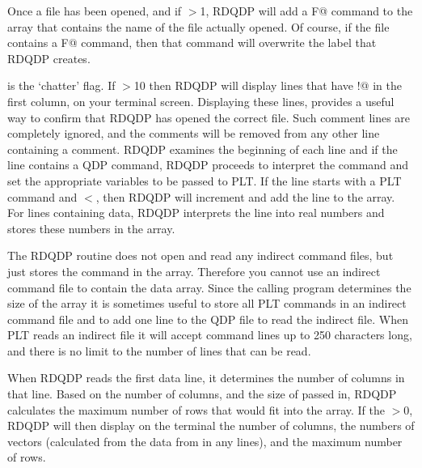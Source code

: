 Once a file has been opened, and if \verb@MXCMD@$>$1, RDQDP
will add a \verb@LAbel F@ command to the \verb@CMD@ array that contains
the name of the file actually opened.
Of course, if the file contains a \verb@LAbel F@ command, then that
command will overwrite the label that RDQDP creates.

\verb@ICHAT@ is the `chatter' flag.
If \verb@ICHAT@$>$10 then RDQDP will display lines that have
\verb@!@ in the first column, on your terminal screen.
Displaying these lines, provides a useful way to confirm that
RDQDP has opened the correct file.
Such comment lines are completely ignored,
and the comments will be removed from any other line containing a comment.
RDQDP examines the beginning of each line and if the
line contains a QDP command, RDQDP proceeds to interpret
the command and set the appropriate variables to be passed to PLT.
If the line starts with a PLT command and \verb@NCMD@$<$\verb@MXCMD@,
then RDQDP will increment \verb@NCMD@ and add the line to the
\verb@CMD@ array.
For lines containing data, RDQDP interprets the line into
real numbers and stores these numbers in the \verb@Y@ array.

The RDQDP routine does not open and read any indirect command files,
but just stores the command in the \verb@CMD@ array.
Therefore you cannot use an indirect command file to contain
the data array.
Since the calling program determines the size of the \verb@CMD@ array
it is sometimes useful to store all PLT commands in an indirect command
file and to add one line to the QDP file to read the indirect file.
When PLT reads an indirect file it will accept command lines
up to 250 characters long, and there is no limit to the number of
lines that can be read.

When RDQDP reads the first data line, it determines the
number of columns in that line.
Based on the number of columns, and the size of \verb@MXPTS@
passed in, RDQDP calculates the maximum number
of rows that would fit into the \verb@Y@ array.
If the \verb@ICHAT@$>0$, RDQDP will then display on the terminal
the number of columns, the numbers of vectors (calculated from the
data from in any \verb@READ@ lines), and the maximum number of
rows.

\pagebreak
